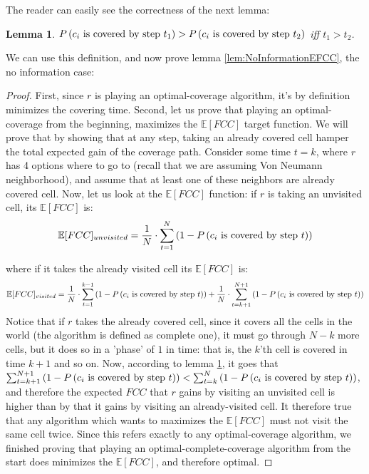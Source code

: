 \documentclass[a4paper,10pt]{article}
\newtheorem{lemma}[theorem]{Lemma}
\newcommand\rob{\ensuremath{r}\xspace}
\newcommand{\fcc}{\ensuremath{FCC}\xspace}
\begin{document}
The reader can easily see the correctness of the next lemma:
\begin{lemma}\label{lemmas:ProbThroughTime}
$P\left(\textnormal{$c_i$ is covered by step $t_1$}\right)>P\left(\textnormal{$c_i$ is covered by step $t_2$}\right)$ iff $t_1>t_2$.
\end{lemma}

We can use this definition, and now prove lemma \ref{lem:NoInformationEFCC}, the no information case:

\begin{proof}
First, since \rob is playing an optimal-coverage algorithm, it's by definition minimizes the covering time.
Second, let us prove that playing an optimal-coverage from the beginning, maximizes the $\mathbb{E}[\fcc]$ target function. We will prove that by showing that at any step, taking an already covered cell hamper the total expected gain of the coverage path.
Consider some time $t=k$, where \rob has 4 options where to go to (recall that we are assuming Von Neumann neighborhood), and assume that at least one of these neighbors are already covered cell.
Now, let us look at the $\mathbb{E}[\fcc]$ function: if \rob is taking an unvisited cell, its $\mathbb{E}[\fcc]$ is:
\[\mathbb{E}[\fcc]_{unvisited}=\frac{1}{N}\cdot \sum_{t=1}^{N}\left(1-P\left(\textnormal{$c_i$ is covered by step $t$}\right)\right)\]

where if it takes the already visited cell its $\mathbb{E}[\fcc]$ is: 
\begin{multline*}
\mathbb{E}[\fcc]_{visited}=\frac{1}{N}\cdot \sum_{t=1}^{k-1}\left(1-P\left(\textnormal{$c_i$ is covered by step $t$}\right)\right) + \frac{1}{N}\cdot \sum_{t=k+1}^{N+1}\left(1-P\left(\textnormal{$c_i$ is covered by step $t$}\right)\right)
\end{multline*}
Notice that if \rob takes the already covered cell, since it covers all the cells in the world (the algorithm is defined as complete one), it must go through $N-k$ more cells, but it does so in a 'phase' of $1$ in time: that is, the $k$'th cell is covered in time $k+1$ and so on.
Now, according to lemma \ref{lemmas:ProbThroughTime}, it goes that $\sum_{t=k+1}^{N+1}\left(1-P\left(\textnormal{$c_i$ is covered by step $t$}\right)\right) < \sum_{t=k}^{N}\left(1-P\left(\textnormal{$c_i$ is covered by step $t$}\right)\right)$, and therefore the expected \fcc that \rob gains by visiting an unvisited cell is higher than by that it gains by visiting an already-visited cell.
It therefore true that any algorithm which wants to maximizes the $\mathbb{E}[\fcc]$ must not visit the same cell twice. Since this refers exactly to any optimal-coverage algorithm, we finished proving that playing an optimal-complete-coverage algorithm from the start does minimizes the $\mathbb{E}[\fcc]$, and therefore optimal.
\end{proof}
\end{document}
